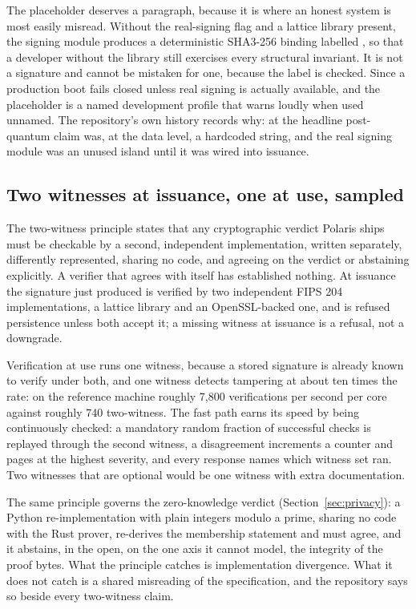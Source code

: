 The placeholder deserves a paragraph, because it is where an honest system is most easily
misread. Without the real-signing flag and a lattice library present, the signing module produces a
deterministic SHA3-256 binding labelled , so that a
developer without the library still exercises every structural invariant. It is not a signature and
cannot be mistaken for one, because the label is checked. Since  a production boot
fails closed unless real signing is actually available, and the placeholder is a named development
profile that warns loudly when used unnamed. The repository's own history records why: at
 the headline post-quantum claim was, at the data level, a hardcoded string, and the
real signing module was an unused island until it was wired into issuance. \sImpl

\subsection{Two witnesses at issuance, one at use, sampled}

The two-witness principle states that any cryptographic verdict Polaris ships must be checkable by
a second, independent implementation, written separately, differently represented, sharing no code,
and agreeing on the verdict or abstaining explicitly. A verifier that agrees with itself has
established nothing. At issuance the signature just produced is verified by two independent FIPS 204
implementations, a lattice library and an OpenSSL-backed one, and is refused persistence unless both
accept it; a missing witness at issuance is a refusal, not a downgrade. \sImpl

Verification at use runs one witness, because a stored signature is already known to verify under
both, and one witness detects tampering at about ten times the rate: on the reference machine
roughly 7,800 verifications per second per core against roughly 740 two-witness. The fast path
earns its speed by being continuously checked: a mandatory random fraction of successful checks is
replayed through the second witness, a disagreement increments a counter and pages at the highest
severity, and every response names which witness set ran. Two witnesses that are optional would be
one witness with extra documentation. \sImpl

The same principle governs the zero-knowledge verdict (Section~\ref{sec:privacy}): a Python
re-implementation with plain integers modulo a prime, sharing no code with the Rust prover,
re-derives the membership statement and must agree, and it abstains, in the open, on the one axis it
cannot model, the integrity of the proof bytes. What the principle catches is implementation
divergence. What it does not catch is a shared misreading of the specification, and the repository
says so beside every two-witness claim.

